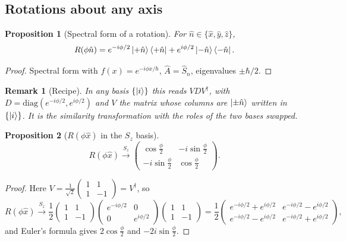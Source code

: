 \documentclass{article}
\newtheorem{remark}{Remark}
\newtheorem{proposition}{Proposition}
\begin{document}
\subsection{Rotations about any axis}
\label{sec:any-axis}
\begin{proposition}[Spectral form of a rotation]
    For $\hat{n} \in \{\hat{x},\hat{y},\hat{z}\}$,
    \begin{equation}
        R(\phi\hat{n}) = e^{-i\phi/2}\ket{+\hat{n}}\bra{+\hat{n}} + e^{i\phi/2}\ket{-\hat{n}}\bra{-\hat{n}}.
    \end{equation}
\end{proposition}
\begin{proof}
    Spectral form with $f(x) = e^{-i\phi x/\hbar}$, $\hat{A} = \hat{S}_n$, eigenvalues $\pm\hbar/2$.
\end{proof}
\begin{remark}[Recipe]
    In any basis $\{\ket{i}\}$ this reads $V D V^\dagger$, with $D = \mathrm{diag}\left(e^{-i\phi/2}, e^{i\phi/2}\right)$ and $V$ the matrix whose columns are $\ket{\pm\hat{n}}$ written in $\{\ket{i}\}$. It is the similarity transformation with the roles of the two bases swapped.
\end{remark}
\begin{proposition}[$R(\phi\hat{x})$ in the $S_z$ basis]
    \begin{equation}
        R(\phi\hat{x}) \xrightarrow{S_z} \begin{pmatrix} \cos\frac{\phi}{2} & -i\sin\frac{\phi}{2} \\ -i\sin\frac{\phi}{2} & \cos\frac{\phi}{2} \end{pmatrix}.
    \end{equation}
\end{proposition}
\begin{proof}
    Here $V = \frac{1}{\sqrt{2}}\begin{pmatrix} 1 & 1 \\ 1 & -1 \end{pmatrix} = V^\dagger$, so
    \[R(\phi\hat{x}) \xrightarrow{S_z} \frac{1}{2}\begin{pmatrix} 1 & 1 \\ 1 & -1 \end{pmatrix}\begin{pmatrix} e^{-i\phi/2} & 0 \\ 0 & e^{i\phi/2} \end{pmatrix}\begin{pmatrix} 1 & 1 \\ 1 & -1 \end{pmatrix} = \frac{1}{2}\begin{pmatrix} e^{-i\phi/2} + e^{i\phi/2} & e^{-i\phi/2} - e^{i\phi/2} \\ e^{-i\phi/2} - e^{i\phi/2} & e^{-i\phi/2} + e^{i\phi/2} \end{pmatrix},\]
    and Euler's formula gives $2\cos\frac{\phi}{2}$ and $-2i\sin\frac{\phi}{2}$.
\end{proof}
\end{document}
